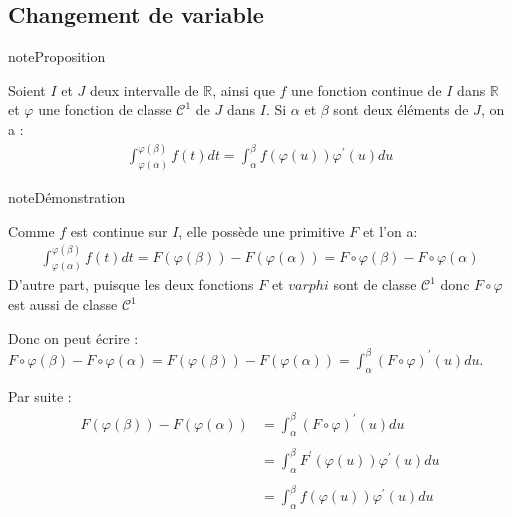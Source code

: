 \documentclass[letterpaper,10pt,french]{sphinxmanual}
\begin{document}
\subsection{Changement de variable}
\label{\detokenize{methodcalp:changement-de-variable}}
\begin{sphinxadmonition}{note}{Proposition}

\sphinxAtStartPar
Soient \(I\) et \(J\) deux intervalle de \(\mathbb R\), ainsi que \(f\) une fonction continue de \(I\) dans \(\mathbb R\) et \(\varphi\) une fonction de classe \(\mathcal C^1\) de \(J\) dans \(I\). Si \(\alpha\) et \(\beta\) sont deux éléments de \(J\), on a :
\begin{equation*}
\begin{split}
\int_{\varphi(\alpha)}^{\varphi(\beta)} f(t)dt = \int_\alpha^\beta f(\varphi(u)) \varphi^{'}(u)du
\end{split}
\end{equation*}\end{sphinxadmonition}

\begin{sphinxadmonition}{note}{Démonstration}

\sphinxAtStartPar
Comme \(f\) est continue sur \(I\), elle possède une primitive \(F\) et l’on a:
\begin{equation*}
\begin{split}
\int_{\varphi(\alpha)}^{\varphi(\beta)} f(t)dt = F(\varphi(\beta)) - F(\varphi(\alpha)) = F \circ\varphi(\beta) - F \circ\varphi(\alpha)
\end{split}
\end{equation*}
\sphinxAtStartPar
D’autre part, puisque les deux fonctions \(F\) et \(varphi\) sont de classe \(\mathcal C^1\) donc \(F \circ\varphi\) est aussi de classe \(\mathcal C^1\)

\sphinxAtStartPar
Donc on peut écrire : \( F \circ\varphi(\beta) - F \circ\varphi(\alpha) = F(\varphi(\beta)) - F(\varphi(\alpha)) = \int_\alpha^\beta  (F \circ\varphi)^{'}(u) du\).

\sphinxAtStartPar
Par suite :
\begin{equation*}
\begin{split}
\begin{aligned}
F(\varphi(\beta)) - F(\varphi(\alpha)) &= \int_\alpha^\beta  (F \circ\varphi)^{'}(u) du \\ \\
& = \int_\alpha^\beta  F^{'}(\varphi(u)) \varphi^{'}(u) du \\ \\
& = \int_\alpha^\beta f(\varphi(u)) \varphi^{'}(u)du
\end{aligned}
\end{split}
\end{equation*}\end{sphinxadmonition}
\end{document}
